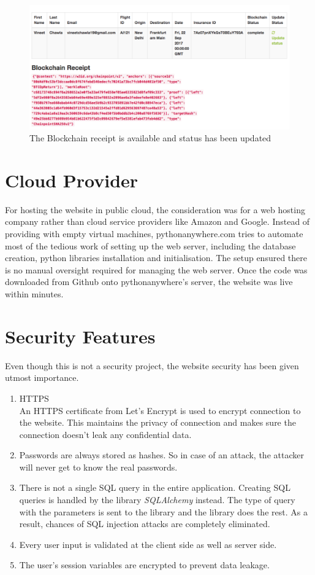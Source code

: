 \begin{figure}[h]
    \centering
    \includegraphics[width=\textwidth]{Figures/complete_dashboard.png}
    \caption{The Blockchain receipt is available and status has been updated}
    \label{fig:complete_dashboard}
\end{figure}

\section{Cloud Provider}
For hosting the website in public cloud, the consideration was for a web hosting company rather than cloud service providers like Amazon and Google. Instead of providing with empty virtual machines, pythonanywhere.com tries to automate most of the tedious work of setting up the web server, including the database creation, python libraries installation and initialisation. 
The setup ensured there is no manual oversight required for managing the web server. Once the code was downloaded from Github onto pythonanywhere's server, the website was live within minutes.


\section{Security Features}
Even though this is not a security project, the website security has been given utmost importance.
\begin{enumerate}
    \item HTTPS
    \\An HTTPS certificate from Let's Encrypt is used to encrypt connection to the website. This maintains the privacy of connection and makes sure the connection doesn't leak any confidential data.
    \item Passwords are always stored as hashes. So in case of an attack, the attacker will never get to know the real passwords.
    \item There is not a single SQL query in the entire application. Creating SQL queries is handled by the library \textit{SQLAlchemy} instead. The type of query with the parameters is sent to the library and the library does the rest. As a result, chances of SQL injection attacks are completely eliminated.
    \item Every user input is validated at the client side as well as server side.
    \item The user's session variables are encrypted to prevent data leakage.
\end{enumerate}


